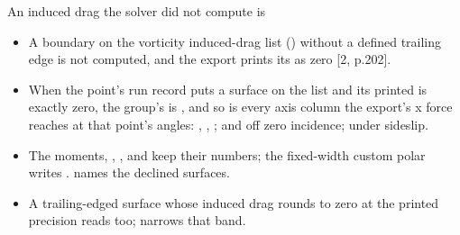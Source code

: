 \begin{frame}{An induced drag the solver did not compute is }
\begin{itemize}\small
  \item A boundary on the vorticity induced-drag list
        () without a defined trailing
        edge is not computed, and the export prints its  as zero
        [2, p.202].
  \item When the point's run record puts a surface on the list and its printed
         is exactly zero, the group's  is , and so
        is every axis column the export's x force reaches at that point's
        angles: , , ;  and 
        off zero incidence;  under sideslip.
  \item The moments, , ,  and  keep
        their numbers; the fixed-width custom polar writes .
         names the declined surfaces.
  \item A trailing-edged surface whose induced drag rounds to zero at the
        printed precision reads  too; 
        narrows that band.
\end{itemize}
\end{frame}
